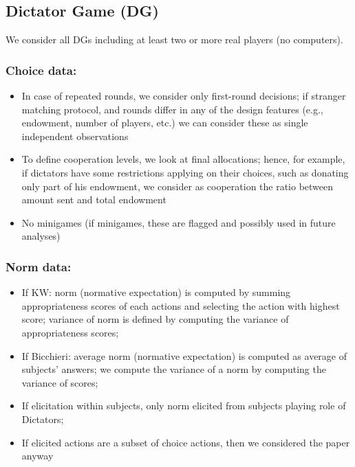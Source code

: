 \documentclass[
]{article}
\providecommand{\tightlist}{%
  \setlength{\itemsep}{0pt}\setlength{\parskip}{0pt}}
\begin{document}
\hypertarget{dictator-game-dg}{%
\subsection{Dictator Game (DG)}\label{dictator-game-dg}}

We consider all DGs including at least two or more real players (no
computers).

\hypertarget{choice-data}{%
\subsubsection{Choice data:}\label{choice-data}}

\begin{itemize}
\tightlist
\item
  In case of repeated rounds, we consider only first-round decisions; if
  stranger matching protocol, and rounds differ in any of the design
  features (e.g., endowment, number of players, etc.) we can consider
  these as single independent observations
\item
  To define cooperation levels, we look at final allocations; hence, for
  example, if dictators have some restrictions applying on their
  choices, such as donating only part of his endowment, we consider as
  cooperation the ratio between amount sent and total endowment
\item
  No minigames (if minigames, these are flagged and possibly used in
  future analyses)
\end{itemize}

\hypertarget{norm-data}{%
\subsubsection{Norm data:}\label{norm-data}}

\begin{itemize}
\tightlist
\item
  If KW: norm (normative expectation) is computed by summing
  appropriateness scores of each actions and selecting the action with
  highest score; variance of norm is defined by computing the variance
  of appropriateness scores;
\item
  If Bicchieri: average norm (normative expectation) is computed as
  average of subjects' answers; we compute the variance of a norm by
  computing the variance of scores;
\item
  If elicitation within subjects, only norm elicited from subjects
  playing role of Dictators;
\item
  If elicited actions are a subset of choice actions, then we considered
  the paper anyway
\end{itemize}
\end{document}
